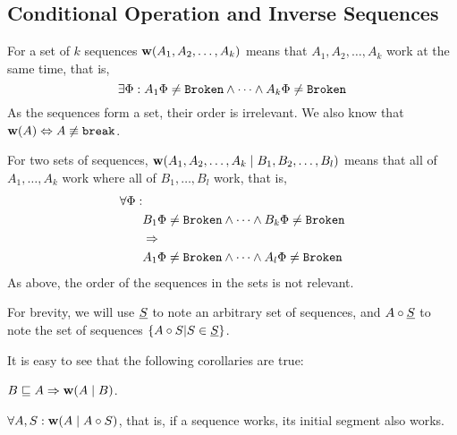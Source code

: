 

\subsection{Conditional Operation and Inverse Sequences}

\begin{mydef}[$\works{x}$]
For a set of $k$ sequences
$\mathbf{w}({A_1,A_2,\ldots,A_k})$ means that 
$A_1,A_2,\ldots,A_k$ work at the same time, that is,
\[\exists \Phi: A_1\Phi\neq\mathtt{Broken} \wedge \cdots \wedge A_k\Phi\neq\mathtt{Broken}\]
As the sequences form a set, their order is irrelevant.
We also know that $\mathbf{w}({A}) \Leftrightarrow A\not\equiv \mathtt{break}$. 
\end{mydef}

\begin{mydef}[$\worksc{x}{y}$]
For two sets of sequences, $\mathbf{w}({A_1,A_2,\ldots,A_k}\mathrel{|}{B_1,B_2,\ldots,B_l})$ means that 
all of $A_1,\ldots,A_k$ work where all of $B_1,\ldots,B_l$ work,
that is,
\begin{align*}
\forall \Phi:&\\ 
&B_1\Phi\neq\mathtt{Broken} \wedge \cdots \wedge B_k\Phi\neq\mathtt{Broken}\\
&\Rightarrow\\
&A_1\Phi\neq\mathtt{Broken} \wedge \cdots \wedge A_l\Phi\neq\mathtt{Broken}
\end{align*}
As above, the order of the sequences in the sets is not relevant.
\end{mydef}

\begin{mydef}
For brevity, we will use $\underline{S}$ to note an arbitrary set of sequences,
and $A\circ\underline{S}$ to note the set of sequences $\{A\circ S|S\in\underline{S}\}$.
\end{mydef}

It is easy to see that the following corollaries are true:


\begin{mycor}
$B\sqsubseteq A \Rightarrow \mathbf{w}({A}\mathrel{|}{B})$.
\end{mycor}

\begin{mycor}\label{worksextpostfix}
$\forall A,S: \mathbf{w}({A}\mathrel{|}{A\circ S})$, that is, if a sequence works, its initial segment also works.
\end{mycor}

